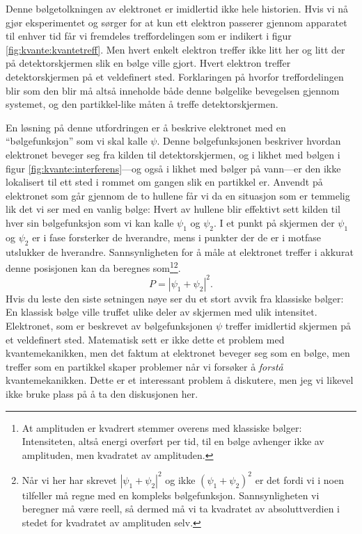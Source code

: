 Denne bølgetolkningen av elektronet er imidlertid ikke hele historien. Hvis vi nå gjør eksperimentet og sørger for at kun ett elektron passerer gjennom apparatet til enhver tid får vi fremdeles treffordelingen som er indikert i figur \ref{fig:kvante:kvantetreff}. Men hvert enkelt elektron treffer ikke litt her og litt der på detektorskjermen slik en bølge ville gjort. Hvert elektron treffer detektorskjermen på et veldefinert sted. Forklaringen på hvorfor treffordelingen blir som den blir må altså inneholde både denne bølgelike bevegelsen gjennom systemet, og den partikkel-like måten å treffe detektorskjermen. 

En løsning på denne utfordringen er å beskrive elektronet med en ``bølge\-funksjon'' som vi skal kalle $\psi$. Denne bølgefunksjonen beskriver hvordan elektronet beveger seg fra kilden til detektorskjermen, og i likhet med bølgen i figur \ref{fig:kvante:interferens}---og også i likhet med bølger på vann---er den ikke lokalisert til ett sted i rommet om gangen slik en partikkel er. Anvendt på elektronet som går gjennom de to hullene får vi da en situasjon som er temmelig lik det vi ser med en vanlig bølge: Hvert av hullene blir effektivt sett kilden til hver sin bølgefunksjon som vi kan kalle $\psi_1$ og $\psi_2$. I et punkt på skjermen der $\psi_1$ og $\psi_2$ er i fase forsterker de hverandre, mens i punkter der de er i motfase utslukker de hverandre. Sannsynligheten for å måle at elektronet treffer i akkurat denne posisjonen kan da beregnes som\footnote{At amplituden er kvadrert stemmer overens med klassiske bølger: Intensiteten, altså energi overført per tid, til en bølge avhenger ikke av amplituden, men kvadratet av amplituden.}\footnote{Når vi her har skrevet $|\psi_1 + \psi_2|^2$ og ikke $(\psi_1+\psi_2)^2$ er det fordi vi i noen tilfeller må regne med en kompleks bølgefunksjon. Sannsynligheten vi beregner må være reell, så dermed må vi ta kvadratet av absoluttverdien i stedet for kvadratet av amplituden selv.}.
\begin{displaymath}
	P = |\psi_1+\psi_2|^2.
\end{displaymath}
Hvis du leste den siste setningen nøye ser du et stort avvik fra klassiske bølger: En klassisk bølge ville truffet ulike deler av skjermen med ulik intensitet. Elektronet, som er beskrevet av bølgefunksjonen $\psi$ treffer imidlertid skjermen på et veldefinert sted. Matematisk sett er ikke dette et problem med kvantemekanikken, men det faktum at elektronet beveger seg som en bølge, men treffer som en partikkel skaper problemer når vi forsøker å \emph{forstå} kvantemekanikken. Dette er et interessant problem å diskutere, men jeg vi likevel ikke bruke plass på å ta den diskusjonen her. 

